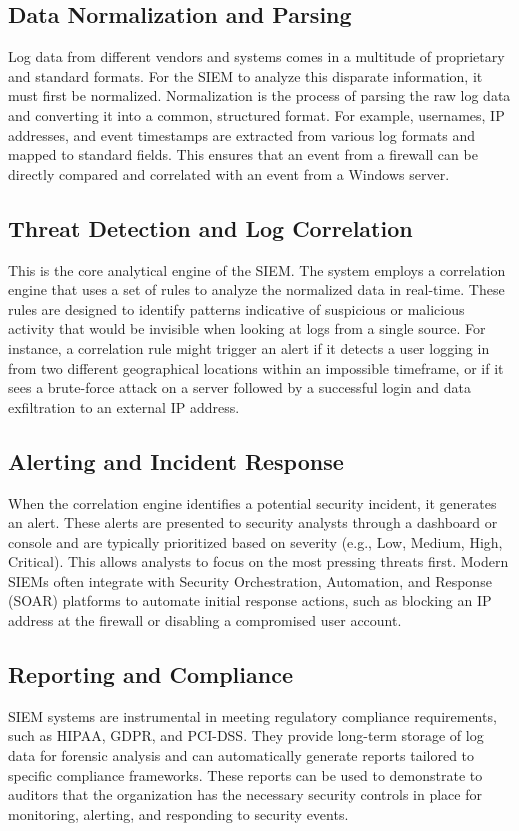 \subsection{Data Normalization and Parsing}
Log data from different vendors and systems comes in a multitude of proprietary and standard formats. For the SIEM to analyze this disparate information, it must first be normalized. Normalization is the process of parsing the raw log data and converting it into a common, structured format. For example, usernames, IP addresses, and event timestamps are extracted from various log formats and mapped to standard fields. This ensures that an event from a firewall can be directly compared and correlated with an event from a Windows server.

 \subsection{Threat Detection and Log Correlation}
This is the core analytical engine of the SIEM. The system employs a correlation engine that uses a set of rules to analyze the normalized data in real-time. These rules are designed to identify patterns indicative of suspicious or malicious activity that would be invisible when looking at logs from a single source. For instance, a correlation rule might trigger an alert if it detects a user logging in from two different geographical locations within an impossible timeframe, or if it sees a brute-force attack on a server followed by a successful login and data exfiltration to an external IP address.


\subsection{Alerting and Incident Response}
When the correlation engine identifies a potential security incident, it generates an alert. These alerts are presented to security analysts through a dashboard or console and are typically prioritized based on severity (e.g., Low, Medium, High, Critical). This allows analysts to focus on the most pressing threats first. Modern SIEMs often integrate with Security Orchestration, Automation, and Response (SOAR) platforms to automate initial response actions, such as blocking an IP address at the firewall or disabling a compromised user account.

\subsection{Reporting and Compliance}
SIEM systems are instrumental in meeting regulatory compliance requirements, such as HIPAA, GDPR, and PCI-DSS. They provide long-term storage of log data for forensic analysis and can automatically generate reports tailored to specific compliance frameworks. These reports can be used to demonstrate to auditors that the organization has the necessary security controls in place for monitoring, alerting, and responding to security events.


